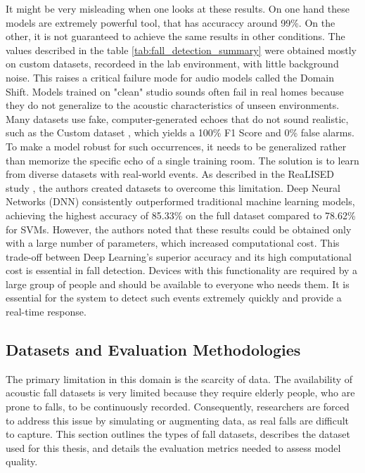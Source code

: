 \documentclass[11pt, a4paper, twoside]{article}
\begin{document}
It might be very misleading when one looks at these results. On one hand these models are extremely powerful tool, that has accuraccy around 99\%. On the other, it is not guaranteed to achieve the same results in other conditions. The values described in the table \ref{tab:fall_detection_summary} were obtained mostly on custom datasets, recordeed in the lab environment, with little background noise. This raises a critical failure mode for audio models called the Domain Shift. Models trained on "clean" studio sounds often fail in real homes because they do not generalize to the acoustic characteristics of unseen environments. Many datasets use fake, computer-generated echoes that do not sound realistic, such as the Custom dataset \cite{Droghini2016}, which yields a 100\% F1 Score and 0\% false alarms. To make a model robust for such occurrences, it needs to be generalized rather than memorize the specific echo of a single training room. The solution is to learn from diverse datasets with real-world events. As described in the ReaLISED study \cite{MohinoHerranz2022ReaLISED}, the authors created datasets to overcome this limitation. Deep Neural Networks (DNN) consistently outperformed traditional machine learning models, achieving the highest accuracy of 85.33\% on the full dataset compared to 78.62\% for SVMs. However, the authors noted that these results could be obtained only with a large number of parameters, which increased computational cost. This trade-off between Deep Learning’s superior accuracy and its high computational cost is essential in fall detection. Devices with this functionality are required by a large group of people and should be available to everyone who needs them. It is essential for the system to detect such events extremely quickly and provide a real-time response.


\subsection{Datasets and Evaluation Methodologies}
\label{datas}
The primary limitation in this domain is the scarcity of data. The availability of acoustic fall datasets is very limited because they require elderly people, who are prone to falls, to be continuously recorded. Consequently, researchers are forced to address this issue by simulating or augmenting data, as real falls are difficult to capture. This section outlines the types of fall datasets, describes the dataset used for this thesis, and details the evaluation metrics needed to assess model quality.
\end{document}
